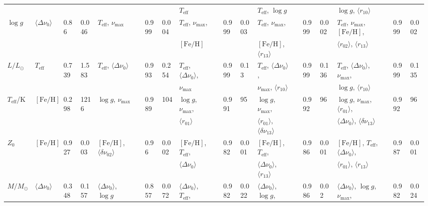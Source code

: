 {\begin{landscape}
\begin{table}
\begin{tabular}{  l | l  l  l | l  l  l  l | l  l  l  l | l  l  l  l | l  l  l  l   }
  &  &  &  &  &  &  &  &  $T_{\text{eff}}$ &  &  &  & $T_{\text{eff}}$, $\log{} g$ &&  & & $\log{} g$, $\langle r_{10}\rangle$ &  &  &\\[3pt]
  $\log{} g$ & $\langle\Delta\nu_0\rangle$ & 0.86 & 0.046 & $T_{\text{eff}}$, $\nu_{\max}$ && 0.999 & 0.004 & $T_{\text{eff}}$, $\nu_{\max}$, && 0.999 & 0.003 & $T_{\text{eff}}$, $\nu_{\max}$, && 0.999 & 0.002 & $T_{\text{eff}}$, $\nu_{\max}$, $[\text{Fe/H}]$, && 0.999 & 0.002\\
  &  &  &  &  &  &  &  &  $[\text{Fe/H}]$ &  &  &  & $[\text{Fe/H}]$, $\langle r_{13}\rangle$ & & & & $\langle r_{02}\rangle$, $\langle r_{13}\rangle$ &  &  &\\[3pt]
  $L/L_\odot$ & $T_{\text{eff}}$ & 0.739 & 1.583 & $T_{\text{eff}}$, $\langle\Delta\nu_0\rangle$ && 0.993 & 0.254 & $T_{\text{eff}}$, $\langle\Delta\nu_0\rangle$, &&0.999 & 0.13 & $T_{\text{eff}}$, $\langle\Delta\nu_0\rangle$, && 0.999 & 0.136 & $T_{\text{eff}}$, $\langle\Delta\nu_0\rangle$, $\nu_{\max}$, && 0.999 & 0.135\\
  &  &  &  &  &  &  &  &  $\nu_{\max}$ &  &  &  & $\nu_{\max}$, $\langle r_{10}\rangle$ &&  & & $\log{} g$, $\langle r_{10}\rangle$ &  &  &\\[3pt]   
 $T_{\text{eff}}$/K & $[\text{Fe/H}]$ & 0.298 & 1216 & $\log{} g$, $\nu_{\max}$ && 0.989 & 104 & $\log{} g$, $\nu_{\max}$, && 0.991 & 95 & $\log{} g$, $\nu_{\max}$, && 0.992 & 96 & $\log{} g$, $\nu_{\max}$, $\langle r_{01}\rangle$, && 0.992 & 96\\
  &  &  &  &  &  &  &  &  $\langle r_{01}\rangle$ &  &  &  & $\langle r_{01}\rangle$, $\langle\delta\nu_{13}\rangle$ &&  & & $\langle\Delta\nu_0\rangle$, $\langle\delta\nu_{13}\rangle$ &  &  &\\[3pt]
    $Z_0$ & $[\text{Fe/H}]$ & 0.927 & 0.003 & $[\text{Fe/H}]$, $\langle\delta\nu_{02}\rangle$ && 0.96 & 0.002 & $[\text{Fe/H}]$, $T_{\text{eff}}$, && 0.982 & 0.001 & $[\text{Fe/H}]$, $T_{\text{eff}}$, && 0.986 & 0.001 & $[\text{Fe/H}]$, $T_{\text{eff}}$, $\langle\Delta\nu_0\rangle$, && 0.987 & 0.001\\
  &  &  &  &  &  &  &  &  $\langle\Delta\nu_0\rangle$ &  &  &  & $\langle\Delta\nu_0\rangle$, $\langle r_{13}\rangle$ &&  & & $\langle r_{01}\rangle$, $\langle r_{13}\rangle$ &  &  &\\[3pt]
  $M/M_\odot$ & $\langle\Delta\nu_0\rangle$ & 0.348 & 0.157 & $\langle\Delta\nu_0\rangle$, $\log{} g$ && 0.857 & 0.072 & $\langle\Delta\nu_0\rangle$, $T_{\text{eff}}$, && 0.982 & 0.022 & $\langle\Delta\nu_0\rangle$, $\log{} g$, && 0.986 & 0.02 & $\langle\Delta\nu_0\rangle$, $\log{} g$, $\nu_{\max}$, && 0.982 & 0.024\\

\end{tabular}
\end{table}
\end{landscape}}
